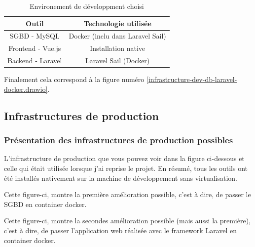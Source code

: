 \documentclass[
    iai, %
    il, %
]{heig-tb}
\begin{document}
\begin{table}[h]
    \begin{center}
        \caption{Environement de développment choisi \label{env-dev}}
        \begin{tabular}{c|c}
            Outil             & Technologie utilisée             \\ \hline
            SGBD - MySQL      & Docker (inclu dans Laravel Sail) \\
            Frontend - Vue.js & Installation native              \\
            Backend - Laravel & Laravel Sail (Docker)            \\
        \end{tabular}
    \end{center}
\end{table}


Finalement cela correspond à la figure numéro \ref{infrastructure-dev-db-laravel-docker.drawio}.

\clearpage
\subsection{Infrastructures de production}

\subsubsection{Présentation des infrastructures de production possibles}
L'infrastructure de production que vous pouvez voir dans la figure ci-dessous et celle qui était utilisée lorsque j'ai reprise le projet.\newline
En résumé, tous les outils ont été installés nativement sur la machine de développement sans virtualisation.\newline
{}

Cette figure-ci, montre la première amélioration possible, c'est à dire, de passer le SGBD en container docker.

Cette figure-ci, montre la secondes amélioration possible (mais aussi la première), c'est à dire, de passer l'application web réalisée avec le framework Laravel en container docker.
\end{document}
